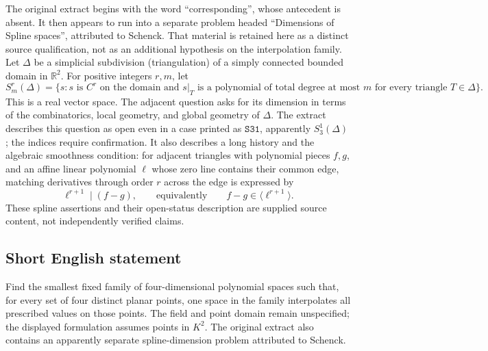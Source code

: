 \documentclass[11pt]{article}
\newcommand{\R}{\mathbb{R}}
\begin{document}
The original extract begins with the word ``corresponding'', whose antecedent is absent. It then appears to run into a separate problem headed ``Dimensions of Spline spaces'', attributed to Schenck. That material is retained here as a distinct source qualification, not as an additional hypothesis on the interpolation family. Let \(\Delta\) be a simplicial subdivision (triangulation) of a simply connected bounded domain in \(\R^2\). For positive integers \(r,m\), let
\[
S_m^r(\Delta)=\{s:s\text{ is }C^r\text{ on the domain and }s|_T
\text{ is a polynomial of total degree at most }m
\text{ for every triangle }T\in\Delta\}.
\]
This is a real vector space. The adjacent question asks for its dimension in terms of the combinatorics, local geometry, and global geometry of \(\Delta\). The extract describes this question as open even in a case printed as \(\texttt{S31}\), apparently \(S_3^1(\Delta)\); the indices require confirmation. It also describes a long history and the algebraic smoothness condition: for adjacent triangles with polynomial pieces \(f,g\), and an affine linear polynomial \(\ell\) whose zero line contains their common edge, matching derivatives through order \(r\) across the edge is expressed by
\[
\ell^{r+1}\mid(f-g),\qquad\text{equivalently}\qquad
f-g\in\langle\ell^{r+1}\rangle.
\]
These spline assertions and their open-status description are supplied source content, not independently verified claims.
\subsection{Short English statement}
Find the smallest fixed family of four-dimensional polynomial spaces such that, for every set of four distinct planar points, one space in the family interpolates all prescribed values on those points. The field and point domain remain unspecified; the displayed formulation assumes points in \(K^2\). The original extract also contains an apparently separate spline-dimension problem attributed to Schenck.
\end{document}
